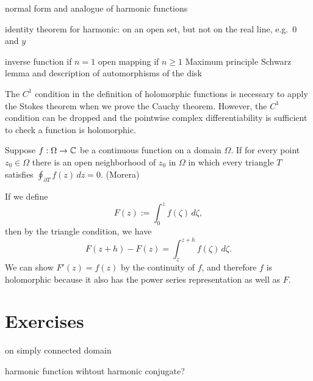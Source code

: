 \documentclass{../../large}
\begin{document}
normal form
and analogue of harmonic functions

\begin{prb}
\end{prb}
identity theorem for harmonic: on an open set, but not on the real line, e.g.~$0$ and $y$

\begin{prb}
\end{prb}
inverse function if $n=1$
open mapping if $n\ge1$
Maximum principle
Schwarz lemma and description of automorphisms of the disk




\begin{prb}
The $C^1$ condition in the definition of holomorphic functions is necessary to apply the Stokes theorem when we prove the Cauchy theorem.
However, the $C^1$ condition can be dropped and the pointwise complex differentiability is sufficient to check a function is holomorphic.

Suppose $f:\Omega\to\mathbb{C}$ be a continuous function on a domain $\Omega$.
If for every point $z_0\in\Omega$ there is an open neighborhood of $z_0$ in $\Omega$ in which every triangle $T$ satisfies $\oint_{\partial T}f(z)\,dz=0$. (Morera)
\end{prb}
\begin{pf}
If we define
\[F(z):=\int_0^zf(\zeta)\,d\zeta,\]
then by the triangle condition, we have
\[F(z+h)-F(z)=\int_z^{z+h}f(\zeta)\,d\zeta.\]
We can show $F'(z)=f(z)$ by the continuity of $f$, and therefore $f$ is holomorphic because it also has the power series representation as well as $F$.
\end{pf}



\section*{Exercises}
\begin{prb}
\end{prb}
\begin{prb}
on simply connected domain
\end{prb}
\begin{prb}
harmonic function wihtout harmonic conjugate?
\end{prb}
\end{document}
